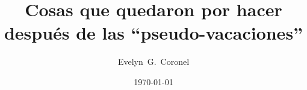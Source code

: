 



\title{Cosas que quedaron por hacer después de las ``pseudo-vacaciones''}
\author{Evelyn~G.~Coronel}


\date[]{\lowercase{\today}} %


\maketitle


